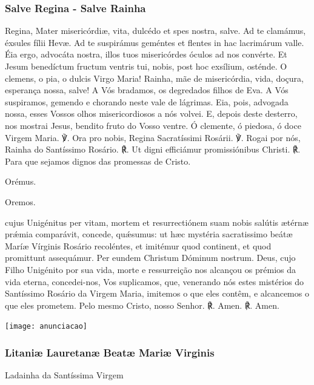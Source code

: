 \subsubsection{Salve Regina - Salve Rainha}
\begin{paracol}{2}
 Regina, Mater misericórdiæ, vita, dulcédo et spes nostra, salve. Ad te clamámus, éxsules fílii Hevæ. Ad te suspirámus geméntes et flentes in hac lacrimárum valle. Éia ergo, advocáta nostra, illos tuos misericórdes óculos ad nos convérte. Et Jesum benedíctum fructum ventris tui, nobis, post hoc exsílium, osténde. O clemens, o pia, o dulcis Virgo Maria!
\switchcolumn
{} Rainha, mãe de misericórdia, vida, doçura, esperança nossa, salve! A Vós bradamos, os degredados filhos de Eva. A Vós suspiramos, gemendo e chorando neste vale de lágrimas. Eia, pois, advogada nossa, esses Vossos olhos misericordiosos a nós volvei. E, depois deste desterro, nos mostrai Jesus, bendito fruto do Vosso ventre. Ó clemente, ó piedosa, ó doce Virgem Maria.
\switchcolumn*
℣. Ora pro nobis, Regina Sacratíssimi Rosárii.
\switchcolumn
℣. Rogai por nós, Rainha do Santíssimo Rosário.
\switchcolumn*
℟. Ut digni efficiámur promissiónibus Christi.
\switchcolumn
℟. Para que sejamos dignos das promessas de Cristo.
\switchcolumn*
\begin{nscenter} {\redx Orémus.} \end{nscenter}
\switchcolumn
\begin{nscenter} {\redx Oremos.} \end{nscenter}
\switchcolumn*
{} cujus Unigénitus per vitam, mortem et resurrectiónem suam nobis salútis ætérnæ prǽmia comparávit, concede, quǽsumus: ut hæc mystéria sacratissimo beátæ Maríæ Vírginis Rosário recoléntes, et imitémur quod continent, et quod promittunt assequámur. Per eundem Christum Dóminum
nostrum.
\switchcolumn
{} Deus, cujo Filho Unigénito por sua vida, morte e ressurreição nos alcançou os prémios da vida eterna, concedei-nos, Vos suplicamos, que, venerando nós estes mistérios do Santíssimo Rosário da Virgem Maria, imitemos o que eles contêm, e alcancemos o que eles prometem. Pelo mesmo Cristo, nosso Senhor.
\switchcolumn*
℟. Amen.
\switchcolumn
℟. Amen.
\end{paracol}

\newpage\begin{nscenter}
\texttt{[image: anunciacao]}
\end{nscenter}

\subsubsection{Litaniæ Lauretanæ Beatæ Mariæ Virginis}
\begin{nscenter}Ladainha da Santíssima Virgem\end{nscenter}

